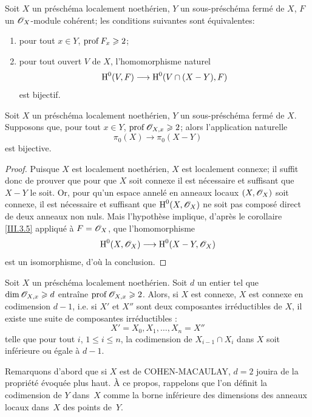 \begin{corollaire} \label{III.3.5}
Soit $X$ un pr\'esch\'ema localement noeth\'erien, $Y$ un sous-pr\'esch\'ema ferm\'e de $X$, $F$ un $\mathscr{O}_X$-module coh\'erent; les conditions suivantes sont \'equivalentes:
\begin{enumerate}
\item
pour tout $x\in Y$, $\operatorname{prof} F_x \geqslant 2$;
\item
pour tout ouvert $V$ de $X$, l'homomorphisme naturel
\[
\H^0(V, F) \to \H^0(V\cap(X-Y), F)
\]
est bijectif.
\end{enumerate}
\end{corollaire}
\egroup

\begin{theoreme}[HARTSHORNE] \label{III.3.6}
Soit $X$ un pr\'esch\'ema localement noeth\'erien, $Y$ un sous-pr\'esch\'ema ferm\'e de $X$. Supposons que, pour tout $x\in Y$, $\operatorname{prof} {\mathscr O}_{X, x} \geqslant 2$; alors l'application naturelle
\[
\pi_0(X) \to \pi_0(X-Y)
\]
est bijective.
\end{theoreme}

\begin{proof}
Puisque $X$ est localement noeth\'erien, $X$ est localement connexe; il suffit donc de prouver que pour que $X$ soit connexe il est n\'ecessaire et suffisant que $X-Y$ le soit. Or, pour qu'un espace annel\'e en anneaux  locaux $(X, \mathscr{O}_X)$ soit connexe, il est n\'ecessaire et suffisant que $\operatorname{H}^0(X, \mathscr{O}_X)$ ne soit pas compos\'e direct de deux anneaux non nuls. Mais l'hypoth\`ese implique, d'apr\`es le corollaire \ref{III.3.5} appliqu\'e \`a $F=\mathscr{O}_X$, que l'homomorphisme
\[
\H^0(X, \OX) \to \H^0(X-Y, \OX)
\]
est un isomorphisme, d'o\`u la conclusion.
\skipqed
\end{proof}

\begin{corollaire} \label{III.3.7}
Soit $X$ un pr\'esch\'ema localement noeth\'erien. Soit $d$ un entier tel que $\dim {\mathscr O}_{X, x} \geqslant d$ entra\^ine $\operatorname{prof} {\mathscr O}_{X, x} \geqslant 2$. Alors, si $X$ est connexe, $X$ est connexe en codimension $d-1$, i.e. si $X'$ et $X''$ sont deux composantes irr\'eductibles de $X$, il existe une suite de composantes irr\'eductibles :
\[
X'=X_0, X_1, \ldots, X_n=X''
\]
telle que pour tout $i$, $1\leq i \leq n$, la codimension de $X_{i-1}\cap X_i$ dans $X$ soit inf\'erieure ou \'egale \`a $d-1$.
\end{corollaire}

Remarquons d'abord que si $X$ est de COHEN-MACAULAY, $d=2$ jouira de la propri\'et\'e \'evoqu\'ee plus haut. \`A ce propos, rappelons que l'on d\'efinit la codimension de $Y$ dans~$X$ comme la borne inf\'erieure des dimensions des anneaux locaux dans~$X$ des points de~$Y$.

